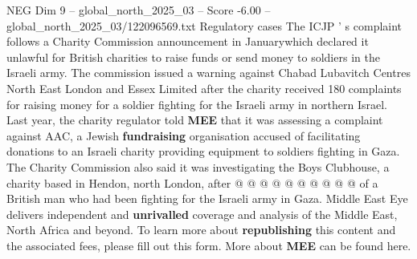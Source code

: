 \begin{textsample}{NEG Dim 9 – global\_north\_2025\_03 – Score -6.00 – global\_north\_2025\_03/122096569.txt}
Regulatory cases The ICJP ' s complaint follows a Charity Commission announcement in Januarywhich declared it unlawful for British charities to raise funds or send money to soldiers in the Israeli army.
The commission issued a warning against Chabad Lubavitch Centres North East London and Essex Limited after the charity received 180 complaints for raising money for a soldier fighting for the Israeli army in northern Israel.
Last year, the charity regulator told \textbf{MEE} that it was assessing a complaint against AAC, a Jewish \textbf{fundraising} organisation accused of facilitating donations to an Israeli charity providing equipment to soldiers fighting in Gaza.
The Charity Commission also said it was investigating the Boys Clubhouse, a charity based in Hendon, north London, after @ @ @ @ @ @ @ @ @ @ of a British man who had been fighting for the Israeli army in Gaza.
Middle East Eye delivers independent and \textbf{unrivalled} coverage and analysis of the Middle East, North Africa and beyond.
To learn more about \textbf{republishing} this content and the associated fees, please fill out this form.
More about \textbf{MEE} can be found here.

\end{textsample}
